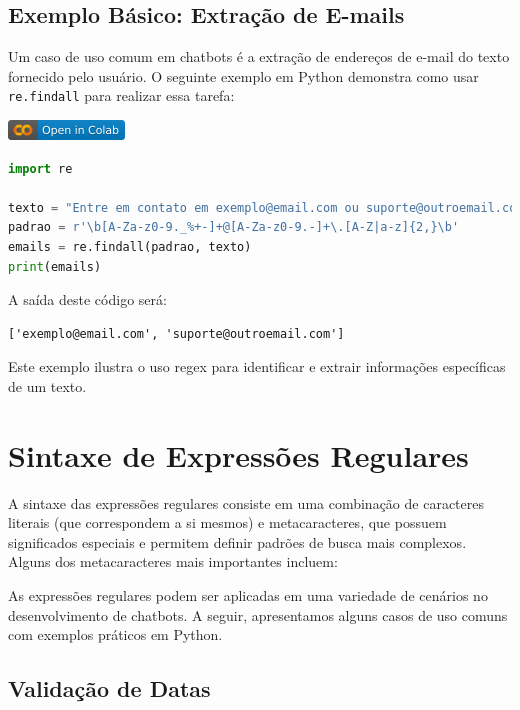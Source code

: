 \documentclass[14pt,a4paper,oneside]{book}
\begin{document}
\subsection{Exemplo Básico: Extração de E-mails}

Um caso de uso comum em chatbots é a extração de endereços de e-mail do texto fornecido pelo usuário. O seguinte exemplo em Python demonstra como usar \texttt{re.findall} para realizar essa tarefa:

\vspace{\baselineskip}
\href{https://colab.research.google.com/github/giseldo/chatbotbook/blob/main/notebook/cap11.ipynb}{
  \includegraphics{./fig/colab-badge.png}
}

\begin{lstlisting}[language=Python, caption=Extração de e-mails com regex, label=lst:extracao_email]
import re

texto = "Entre em contato em exemplo@email.com ou suporte@outroemail.com."
padrao = r'\b[A-Za-z0-9._%+-]+@[A-Za-z0-9.-]+\.[A-Z|a-z]{2,}\b'
emails = re.findall(padrao, texto)
print(emails)
\end{lstlisting}

A saída deste código será:

\begin{lstlisting}
['exemplo@email.com', 'suporte@outroemail.com']
\end{lstlisting}

Este exemplo ilustra o uso  regex para identificar e extrair informações específicas de um texto.

\section{Sintaxe de Expressões Regulares}

A sintaxe das expressões regulares consiste em uma combinação de caracteres literais (que correspondem a si mesmos) e metacaracteres, que possuem significados especiais e permitem definir padrões de busca mais complexos. Alguns dos metacaracteres mais importantes incluem:

As expressões regulares podem ser aplicadas em uma variedade de cenários no desenvolvimento de chatbots. A seguir, apresentamos alguns casos de uso comuns com exemplos práticos em Python.

\subsection{Validação de Datas}
\end{document}
